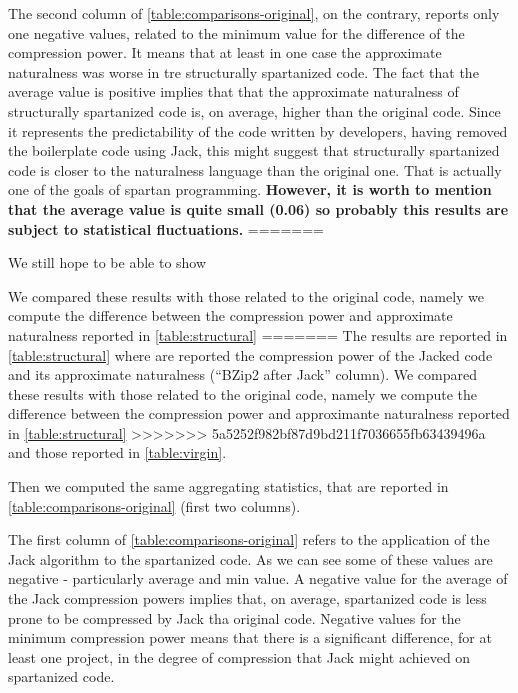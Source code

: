 The second column of \cref{table:comparisons-original}, on the contrary, reports only
one negative values, related to the minimum value for the difference of the compression power.
It means that at least in one case the approximate naturalness was worse in tre
structurally spartanized code. The fact that the average value is positive implies that
that the approximate naturalness of structurally spartanized
code is, on average, higher than the original code. Since it represents the predictability of
the code written by developers, having removed the boilerplate code using Jack, this
might suggest that structurally spartanized code is closer to the naturalness language
than the original one. That is actually one of the goals of spartan programming.
\textbf{However, it is worth to mention that the average value is quite small (0.06) so
probably this results are subject to statistical fluctuations.}
=======

We still hope to be able to show  


We compared these results %
with those related to the original code, namely we compute the difference
between the compression power and approximate naturalness reported in \cref{table:structural}
=======
The results are reported in \cref{table:structural} where are reported
the compression power of the Jacked code and its approximate
naturalness (``BZip2 after Jack'' column).
We compared these results %
with those related to the original code, namely we compute the difference 
between the compression power and approximante naturalness reported in \cref{table:structural}
>>>>>>> 5a5252f982bf87d9bd211f7036655fb63439496a
and those reported in \cref{table:virgin}.

Then we computed the same aggregating statistics, that are reported in
\cref{table:comparisons-original} (first two columns).


The first column of \cref{table:comparisons-original} refers to the application of the Jack
algorithm to the spartanized code. As we can see some of these values are negative - particularly 
average and min value. 
A negative value for the average of the Jack compression powers implies that, 
on average, spartanized code is less prone to be compressed by Jack tha original code. 
Negative values for the minimum compression power means
that there is a significant difference, for at least one project, in the degree of compression
that Jack might achieved on spartanized code. 

